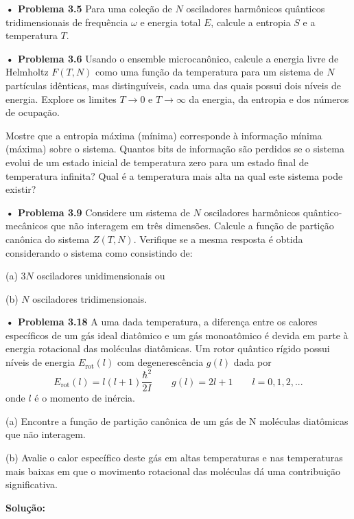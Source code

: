 \documentclass[12pt]{article}
\begin{document}
\textbf{• Problema 3.5} Para uma coleção de $N$ osciladores harmônicos quânticos tridimensionais de frequência $\omega$ e energia total $E$, calcule a entropia $S$ e a temperatura $T$.

\textbf{• Problema 3.6} Usando o ensemble microcanônico, calcule a energia livre de Helmholtz $F(T, N)$ como uma função da temperatura para um sistema de $N$ partículas idênticas, mas distinguíveis, cada uma das quais possui dois níveis de energia. Explore os limites $T \rightarrow 0$ e $T \rightarrow \infty$ da energia, da entropia e dos números de ocupação.

Mostre que a entropia máxima (mínima) corresponde à informação mínima (máxima) sobre o sistema. Quantos bits de informação são perdidos se o sistema evolui de um estado inicial de temperatura zero para um estado final de temperatura infinita? Qual é a temperatura mais alta na qual este sistema pode existir?

\textbf{• Problema 3.9} Considere um sistema de $N$ osciladores harmônicos quântico-mecânicos que não interagem em três dimensões. Calcule a função de partição canônica do sistema $Z(T, N)$. Verifique se a mesma resposta é obtida considerando o sistema como consistindo de:

(a) $3N$ osciladores unidimensionais ou

(b) $N$ osciladores tridimensionais.

\textbf{• Problema 3.18} A uma dada temperatura, a diferença entre os calores específicos de um gás ideal diatômico e um gás monoatômico é devida em parte à energia rotacional das moléculas diatômicas. Um rotor quântico rígido possui níveis de energia $E_\text{rot}(l)$ com degenerescência $g(l)$ dada por 
\[
E_{\text{rot}}(l) = l(l+1) \frac{\hbar^2}{2I} \qquad g(l) = 2l + 1 \qquad l = 0, 1, 2, ...
\]
 onde $l$ é o momento de inércia.
 
(a) Encontre a função de partição canônica de um gás de N moléculas diatômicas que não interagem.

(b) Avalie o calor específico deste gás em altas temperaturas e nas temperaturas mais baixas em que o movimento rotacional das moléculas dá uma contribuição significativa.

 \textbf{Solução:}
 
\end{document}
